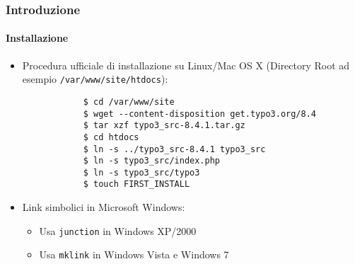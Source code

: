 \begin{frame}[fragile]
	\frametitle{Introduzione}
	\framesubtitle{Installazione}

	\begin{itemize}
		\item Procedura ufficiale di installazione su Linux/Mac OS X\newline
			(Directory Root ad esempio \texttt{/var/www/site/htdocs}):
		\begin{lstlisting}
			$ cd /var/www/site
			$ wget --content-disposition get.typo3.org/8.4
			$ tar xzf typo3_src-8.4.1.tar.gz
			$ cd htdocs
			$ ln -s ../typo3_src-8.4.1 typo3_src
			$ ln -s typo3_src/index.php
			$ ln -s typo3_src/typo3
			$ touch FIRST_INSTALL
		\end{lstlisting}

		\item Link simbolici in Microsoft Windows:

			\begin{itemize}
				\item Usa \texttt{junction} in Windows XP/2000
				\item Usa \texttt{mklink} in Windows Vista e Windows 7
			\end{itemize}

	\end{itemize}
\end{frame}

